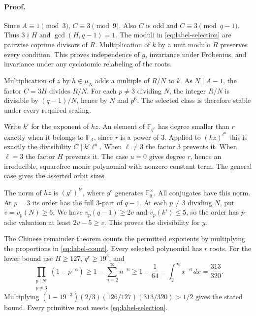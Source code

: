 \paragraph{Proof.}
Since $A\equiv1\pmod3$, $C\equiv3\pmod9$. Also $C$ is odd and $C\equiv3\pmod{q-1}$. Thus $3\nmid H$ and $\gcd(H,q-1)=1$. The moduli in \eqref{eq:label-selection} are pairwise coprime divisors of $R$. Multiplication of $k$ by a unit modulo $R$ preserves every condition. This proves independence of $g$, invariance under Frobenius, and invariance under any cyclotomic relabeling of the roots.

Multiplication of $z$ by $h\in\mu_N$ adds a multiple of $R/N$ to $k$. As $N\mid A-1$, the factor $C=3H$ divides $R/N$. For each $p\ne3$ dividing $N$, the integer $R/N$ is divisible by $(q-1)/N$, hence by $N$ and $p^6$. The selected class is therefore stable under every required scaling.

Write $k'$ for the exponent of $hz$. An element of $\mathbb F_{q^r}$ has degree smaller than $r$ exactly when it belongs to $\mathbb F_A$, since $r$ is a power of $3$. Applied to $(hz)^{\ell^u}$ this is exactly the divisibility $C\mid k'\ell^u$. When $\ell\ne3$ the factor $3$ prevents it. When $\ell=3$ the factor $H$ prevents it. The case $u=0$ gives degree $r$, hence an irreducible, squarefree monic polynomial with nonzero constant term. The general case gives the asserted orbit sizes.

The norm of $hz$ is $(g^e)^{k'}$, where $g^e$ generates $\mathbb F_q^{\times}$. All conjugates have this norm. At $p=3$ its order has the full $3$-part of $q-1$. At each $p\ne3$ dividing $N$, put $v=v_p(N)\ge6$. We have $v_p(q-1)\ge2v$ and $v_p(k')\le5$, so the order has $p$-adic valuation at least $2v-5\ge v$. This proves the divisibility for $y$.

The Chinese remainder theorem counts the permitted exponents by multiplying the proportions in \eqref{eq:label-count}. Every selected polynomial has $r$ roots. For the lower bound use $H\ge127$, $q^r\ge19^3$, and
\[
 \prod_{\substack{p\mid N\\p\ne3}}(1-p^{-6})
 \ge 1-\sum_{n=2}^\infty n^{-6}
 \ge 1-\frac1{64}-\int_2^\infty x^{-6}\,dx=\frac{313}{320}.
\]
Multiplying $(1-19^{-3})(2/3)(126/127)(313/320)>1/2$ gives the stated bound. Every primitive root meets \eqref{eq:label-selection}.

